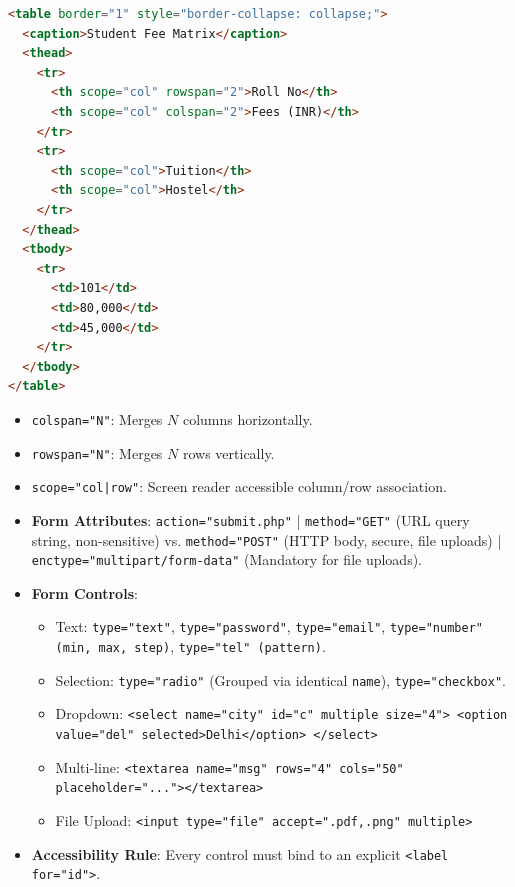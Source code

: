 \documentclass[a4paper,11pt]{article}
\begin{document}
\begin{conceptbox}
\begin{lstlisting}[language=HTML]
<table border="1" style="border-collapse: collapse;">
  <caption>Student Fee Matrix</caption>
  <thead>
    <tr>
      <th scope="col" rowspan="2">Roll No</th>
      <th scope="col" colspan="2">Fees (INR)</th>
    </tr>
    <tr>
      <th scope="col">Tuition</th>
      <th scope="col">Hostel</th>
    </tr>
  </thead>
  <tbody>
    <tr>
      <td>101</td>
      <td>80,000</td>
      <td>45,000</td>
    </tr>
  </tbody>
</table>
\end{lstlisting}
\begin{itemize}[leftmargin=*]
    \item \texttt{colspan="N"}: Merges $N$ columns horizontally.
    \item \texttt{rowspan="N"}: Merges $N$ rows vertically.
    \item \texttt{scope="col|row"}: Screen reader accessible column/row association.
\end{itemize}
\end{conceptbox}

\begin{examalert}
\begin{itemize}[leftmargin=*]
    \item \textbf{Form Attributes}: \texttt{action="submit.php"} | \texttt{method="GET"} (URL query string, non-sensitive) vs. \texttt{method="POST"} (HTTP body, secure, file uploads) | \texttt{enctype="multipart/form-data"} (Mandatory for file uploads).
    \item \textbf{Form Controls}:
    \begin{itemize}
        \item Text: \texttt{type="text"}, \texttt{type="password"}, \texttt{type="email"}, \texttt{type="number" (min, max, step)}, \texttt{type="tel" (pattern)}.
        \item Selection: \texttt{type="radio"} (Grouped via identical \texttt{name}), \texttt{type="checkbox"}.
        \item Dropdown: \texttt{<select name="city" id="c" multiple size="4"> <option value="del" selected>Delhi</option> </select>}
        \item Multi-line: \texttt{<textarea name="msg" rows="4" cols="50" placeholder="..."></textarea>}
        \item File Upload: \texttt{<input type="file" accept=".pdf,.png" multiple>}
    \end{itemize}
    \item \textbf{Accessibility Rule}: Every control must bind to an explicit \texttt{<label for="id">}.
\end{itemize}
\end{examalert}
\end{document}
